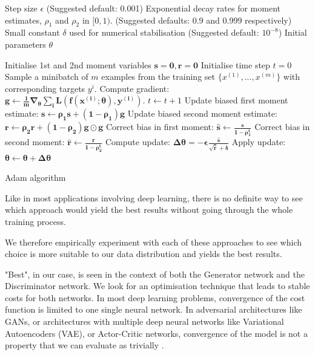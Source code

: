 \begin{algorithm}[ht]
\begin{algorithmic}
    Step size $\epsilon$ (Suggested default: 0.001)
    Exponential decay rates for moment estimates, $\rho_1$ and $\rho_2$ in $[0,1)$. (Suggested defaults: 0.9 and 0.999 respectively)
    Small constant $\delta$ used for numerical stabilisation (Suggested default: $10^{-8}$)
    Initial parameters $\theta$
   
   \State Initialise 1st and 2nd moment variables $\mathbf{s=0, r=0}$
   \State Initialise time step $t=0$
   \State Sample a minibatch of $m$ examples from the training set $\{x^{(1)},...,x^{(m)}\}$ with corresponding targets $y^{i}$.
   \State Compute gradient: $\boldsymbol{g \leftarrow \frac{1}{m}\nabla_\theta \sum_i L(f(x^{(i)}; \theta), y^{(i)}).}$
   \State $t \leftarrow t + 1$
   \State Update biased first moment estimate: $\boldsymbol{s \leftarrow \rho_1 s + (1-\rho_1) g}$
   \State Update biased second moment estimate: $\boldsymbol{r \leftarrow \rho_2 r + (1-\rho_2) g \odot g}$
   \State Correct bias in first moment: $\boldsymbol{\hat{s} \leftarrow \frac{s}{1-\rho_1^t}}$
   \State Correct bias in second moment: $\boldsymbol{\hat{r} \leftarrow \frac{r}{1-\rho_2^t}}$
   \State Compute update: $\boldsymbol{\Delta \theta = -\epsilon \frac{\hat{s}}{\sqrt{\hat{r}} + \delta}}$
   \State Apply update: $\boldsymbol{\theta \leftarrow \theta + \Delta \theta}$
   \EndWhile
\end{algorithmic}
  \caption{Adam algorithm}
  \label{alg:Adam}
\end{algorithm}

Like in most applications involving deep learning, there is no definite way to see which approach would yield the best results without going through the whole training process.

We therefore empirically experiment with each of these approaches to see which choice is more suitable to our data distribution and yields the best results.

"Best", in our case, is seen in the context of both the Generator network and the Discriminator network. We look for an optimisation technique that leads to stable costs for both networks. In most deep learning problems, convergence of the cost function is limited to one single neural network. In adversarial architectures like GANs, or architectures with multiple deep neural networks like Variational Autoencoders (VAE), or Actor-Critic networks, convergence of the model is not a property that we can evaluate as trivially \citep{kingma2013auto, grondman2012survey}.

